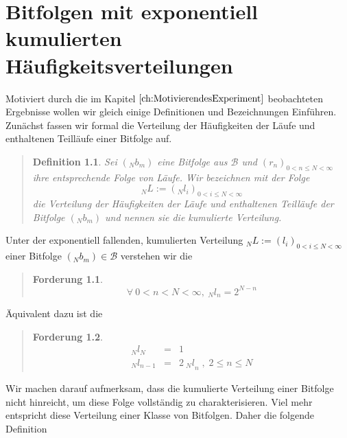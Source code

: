 \documentclass[11pt,oneside,a4paper]{scrreprt}
\newtheorem{defi}{Definition}
\newtheorem{ford}{Forderung}
\begin{document}
\chapter{Bitfolgen mit exponentiell kumulierten Häufigkeitsverteilungen}\label{ch:Bitfolgen,dieDasFortsetzungsaxiomErfüllen}
Motiviert durch die im Kapitel $\ref{ch:MotivierendesExperiment}$ beobachteten Ergebnisse wollen wir gleich einige Definitionen und Bezeichnungen Einführen. Zunächst fassen wir formal die Verteilung der Häufigkeiten der Läufe und enthaltenen Teilläufe einer Bitfolge auf.
\begin{quote}
	\begin{defi}\label{def:L Verteilung Der Läufe} Sei $(_Nb_m)$ eine Bitfolge aus $\mathcal B$ und $(r_n)_{0<n\leq N<\infty}$ ihre entsprechende Folge von Läufe. Wir bezeichnen mit der Folge 
	\begin{equation}
	_NL:=( _Nl_i )_{0<i\leq N<\infty} 
	\end{equation}
	die Verteilung der Häufigkeiten der Läufe und enthaltenen Teilläufe der Bitfolge $(_Nb_m)$ und nennen sie die kumulierte Verteilung.
\end{defi}
\end{quote}

\noindent Unter der exponentiell fallenden, kumulierten Verteilung $_NL:=(l_i)_{0<i\leq N<\infty}$ einer Bitfolge $(_Nb_m)\in\mathcal B$ verstehen wir die
\begin{quote}
	\begin{ford}\label{ford: exponentieller Verlauf}
	\begin{equation}\label{eqn:exponentieller Verlauf}
		\forall\ 0<n<N<\infty,\ _Nl_n=2^{N-n}
	\end{equation}
\end{ford}
\end{quote}
\noindent Äquivalent dazu ist die
\begin{quote}
	\begin{ford}\label{ford:l i minus 1 gleicht 2 x l i}
	\begin{eqnarray}
_Nl_N&=&1\label{eqn:L_N Gleich 1}\\
_Nl_{n-1}&=&2\ {_Nl}_n\;,\; 2\leq n\leq N\label{eqn:l_i Minus 1 Gleich 2 l_i}
	\end{eqnarray}
\end{ford}
\end{quote}
\noindent Wir machen darauf aufmerksam, dass die kumulierte Verteilung einer Bitfolge nicht hinreicht, um diese Folge vollständig zu charakterisieren. Viel mehr entspricht diese Verteilung einer Klasse von Bitfolgen. Daher die folgende Definition
\end{document}
